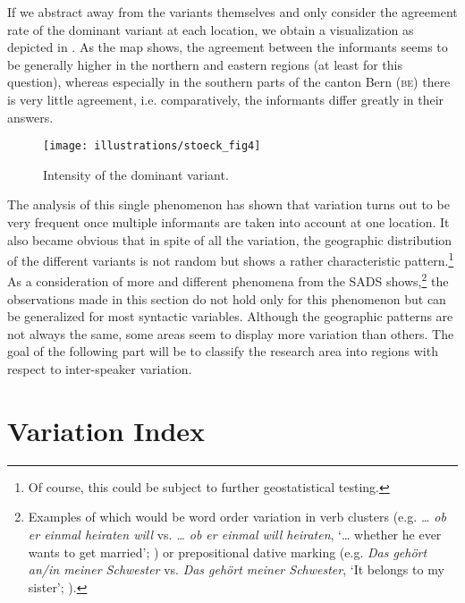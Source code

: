 \documentclass[output=paper]{LSP/langsci}
\begin{document}
If we abstract away from the variants themselves and only consider the agreement rate of the dominant variant at each location, we obtain a visualization as depicted in . As the map shows, the agreement between the informants seems to be generally higher in the northern and eastern regions (at least for this question), whereas especially in the southern parts of the canton Bern (\textsc{be}) there is very little agreement, i.e. comparatively, the informants differ greatly in their answers.
  
\begin{figure}
\texttt{[image: illustrations/stoeck\_fig4]}
\label{fig:4}
\caption{Intensity of the dominant variant.}
\end{figure}
 
The analysis of this single phenomenon has shown that variation turns out to be very frequent once multiple informants are taken into account at one location. It also became obvious that in spite of all the variation, the geographic distribution of the different variants is not random but shows a rather characteristic pattern.\footnote{ Of course, this could be subject to further geostatistical testing.} As a consideration of more and different phenomena from the SADS shows,\footnote{ Examples of which would be word order variation in verb clusters (e.g. \emph{… ob er einmal heiraten will} vs. \emph{… ob er einmal will heiraten}, ‘… whether he ever wants to get married’; \citealt{seiler_three_2004}) or prepositional dative marking (e.g. \emph{Das gehört an/in meiner Schwester} vs. \emph{Das gehört meiner Schwester}, ‘It belongs to my sister’; \citealt{seiler_prapositionale_2003}).} the observations made in this section do not hold only for this phenomenon but can be generalized for most syntactic variables. Although the geographic patterns are not always the same, some areas seem to display more variation than others. The goal of the following part will be to classify the research area into regions with respect to inter-speaker variation.

\section{Variation Index}
\end{document}
